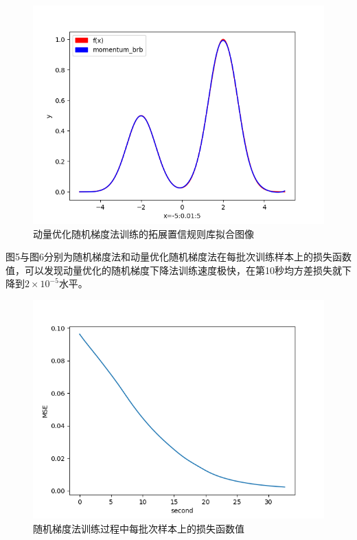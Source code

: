 \documentclass{cjc}
\begin{document}
\begin{figure}
	\includegraphics[width=\linewidth]{momentum_brb_fit.png}
	\caption{动量优化随机梯度法训练的拓展置信规则库拟合图像}
\end{figure}

图5与图6分别为随机梯度法和动量优化随机梯度法在每批次训练样本上的损失函数值，可以发现动量优化的随机梯度下降法训练速度极快，在第10秒均方差损失就下降到$2\times10^{-5}$水平。
\begin{figure}
	\includegraphics[width=\linewidth]{sgd_loss.png}
	\caption{随机梯度法训练过程中每批次样本上的损失函数值}
\end{figure}
\end{document}
